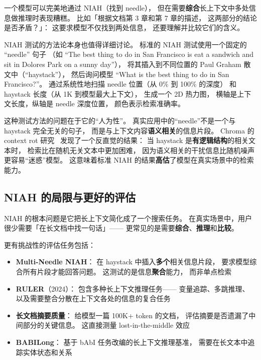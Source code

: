 一个模型可以完美地通过 NIAH（找到 needle），
但在需要\textbf{综合}长上下文中多处信息做推理时表现糟糕。
比如「根据文档第 3 章和第 7 章的描述，
这两部分的结论是否矛盾？」：
这要求模型不仅找到两处信息，
还要理解并比较它们的含义。

NIAH 测试的方法论本身也值得详细讨论。
标准的 NIAH 测试使用一个固定的 “needle” 句子
（如 “The best thing to do in San Francisco is eat a sandwich and sit in Dolores Park on a sunny day”），
将其插入到不同位置的 Paul Graham 散文中（“haystack”），
然后询问模型 “What is the best thing to do in San Francisco?”。
通过系统性地扫描 needle 位置（从 0\% 到 100\% 的深度）
和 haystack 长度（从 1K 到模型最大上下文），
生成一个 2D 热力图，
横轴是上下文长度，纵轴是 needle 深度位置，
颜色表示检索准确率。

这种测试方法的问题在于它的“人为性”。
真实应用中的“needle”不是一个与 haystack 完全无关的句子，
而是与上下文内容\textbf{语义相关}的信息片段。
Chroma 的 context rot 研究~\cite{chroma2025contextrot}
发现了一个反直觉的结果：
当 haystack 是\textbf{有逻辑结构}的相关文本时，
检索比在随机无关文本中更加困难，
因为语义相关的干扰信息比随机噪声更容易“迷惑”模型。
这意味着标准 NIAH 的结果\textbf{高估}了模型在真实场景中的检索能力。

\subsection{NIAH 的局限与更好的评估}

NIAH 的根本问题是它把长上下文简化成了一个搜索任务。
在真实场景中，用户很少需要「在长文档中找一句话」——
更常见的是需要\textbf{综合}、\textbf{推理}和\textbf{比较}。

更有挑战性的评估任务包括：
\begin{itemize}[noitemsep]
  \item \textbf{Multi-Needle NIAH}：
        在 haystack 中插入\textbf{多个}相关信息片段，
        要求模型综合所有片段才能回答问题。
        这测试的是信息\textbf{聚合}能力，
        而非单点检索
  \item \textbf{RULER}（2024）：
        包含多种长上下文推理任务——
        变量追踪、多跳推理、
        以及需要整合分散在上下文各处的信息的复合任务
  \item \textbf{长文档摘要质量}：
        给模型一篇 100K+ token 的文档，
        评估摘要是否遗漏了中间部分的关键信息。
        这直接测量 lost-in-the-middle 效应
  \item \textbf{BABILong}：
        基于 bAbI 任务改编的长上下文推理基准，
        需要在长文本中追踪实体状态和关系
\end{itemize}

